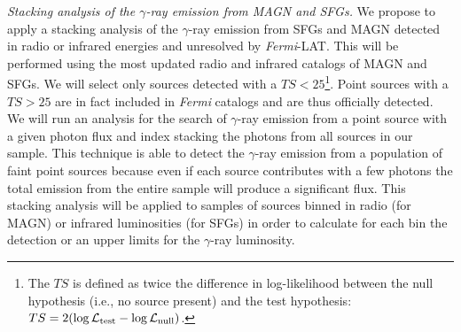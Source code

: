 \documentclass[12 pt]{article}
\begin{document}






{\it Stacking analysis of the $\gamma$-ray emission from MAGN and SFGs.} 
We propose to apply a stacking analysis of the $\gamma$-ray emission from SFGs and MAGN detected in radio or infrared energies and unresolved by {\it Fermi}-LAT. This will be performed using the most updated radio and infrared catalogs of MAGN and SFGs. 
We will select only sources detected with a $TS<25$\footnote{The $TS$ is defined as twice the difference in log-likelihood between the null hypothesis (i.e., no source present) and the test hypothesis: $TS = 2 ( \log\mathcal{L}_{\rm test} - \log\mathcal{L}_{\rm null} )$.}. Point sources with a $TS>25$ are in fact included in {\it Fermi} catalogs and are thus officially detected.
We will run an analysis for the search of $\gamma$-ray emission from a point source with a given photon flux and index stacking the photons from all sources in our sample. 
This technique is able to detect the $\gamma$-ray emission from a population of faint point sources because even if each source contributes with a few photons the total emission from the entire sample will produce a significant flux.
This stacking analysis will be applied to samples of sources binned in radio (for MAGN) or infrared luminosities (for SFGs) in order to calculate for each bin the detection or an upper limits for the $\gamma$-ray luminosity. 
\end{document}
